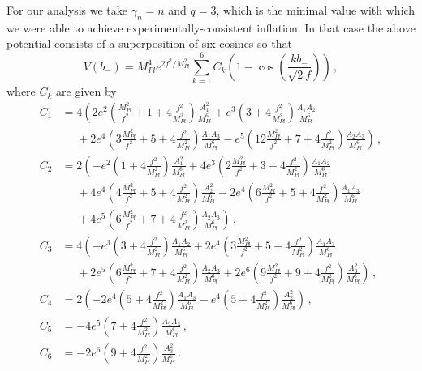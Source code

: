 \documentclass[12pt]{article}
\begin{document}
For our analysis we take $\gamma_n = n$ and $q = 3$, which is the minimal value with which we were able to achieve experimentally-consistent inflation.
In that case the above potential consists of a superposition of six cosines so that
\begin{equation} \label{eq:supergravity:Vslow3}
  V\left(b_-\right)
    = M_{Pl}^4 e^{2 f^2 / M_{Pl}^2} \sum_{k = 1}^6 C_k \left(1 - \cos\left(\frac{k b_-}{\sqrt{2} f}\right)\right)\,,
\end{equation}
where $C_k$ are given by
\begin{equation} \label{eq:supergravity:Vslow3Coefficients}
  \begin{aligned}
    C_1 &=   4 \left(
        2 e^2 \left(   \frac{M_{Pl}^2}{f^2} + 1 + 4 \frac{f^2}{M_{Pl}^2}\right) \frac{A_1^2  }{M_{Pl}^6}
      +   e^3 \left(                          3 + 4 \frac{f^2}{M_{Pl}^2}\right) \frac{A_1 A_2}{M_{Pl}^6}\right.\\
      &~~~~~~ \left.{}
      + 2 e^4 \left( 3 \frac{M_{Pl}^2}{f^2} + 5 + 4 \frac{f^2}{M_{Pl}^2}\right) \frac{A_1 A_3}{M_{Pl}^6}
      -   e^5 \left(12 \frac{M_{Pl}^2}{f^2} + 7 + 4 \frac{f^2}{M_{Pl}^2}\right) \frac{A_2 A_3}{M_{Pl}^6}
    \right)\,,\\
    C_2 &=   2 \left(
      -   e^2 \left(                          1 + 4 \frac{f^2}{M_{Pl}^2}\right) \frac{A_1^2  }{M_{Pl}^6}
      + 4 e^3 \left( 2 \frac{M_{Pl}^2}{f^2} + 3 + 4 \frac{f^2}{M_{Pl}^2}\right) \frac{A_1 A_2}{M_{Pl}^6}\right.\\
      &~~~~~~ \left.{}
      + 4 e^4 \left( 4 \frac{M_{Pl}^2}{f^2} + 5 + 4 \frac{f^2}{M_{Pl}^2}\right) \frac{A_2^2  }{M_{Pl}^6}
      - 2 e^4 \left( 6 \frac{M_{Pl}^2}{f^2} + 5 + 4 \frac{f^2}{M_{Pl}^2}\right) \frac{A_1 A_3}{M_{Pl}^6}\right.\\
      &~~~~~~ \left.{}
      + 4 e^5 \left( 6 \frac{M_{Pl}^2}{f^2} + 7 + 4 \frac{f^2}{M_{Pl}^2}\right) \frac{A_2 A_3}{M_{Pl}^6}
    \right)\,,\\
    C_3 &=   4 \left(
      -   e^3 \left(                          3 + 4 \frac{f^2}{M_{Pl}^2}\right) \frac{A_1 A_2}{M_{Pl}^6}
      + 2 e^4 \left( 3 \frac{M_{Pl}^2}{f^2} + 5 + 4 \frac{f^2}{M_{Pl}^2}\right) \frac{A_1 A_3}{M_{Pl}^6}\right.\\
      &~~~~~~ \left.{}
      + 2 e^5 \left( 6 \frac{M_{Pl}^2}{f^2} + 7 + 4 \frac{f^2}{M_{Pl}^2}\right) \frac{A_2 A_3}{M_{Pl}^6}
      + 2 e^6 \left( 9 \frac{M_{Pl}^2}{f^2} + 9 + 4 \frac{f^2}{M_{Pl}^2}\right) \frac{A_3^2  }{M_{Pl}^6}
    \right)\,,\\
    C_4 &=   2 \left(
      - 2 e^4 \left(                          5 + 4 \frac{f^2}{M_{Pl}^2}\right) \frac{A_1 A_3}{M_{Pl}^6}
      -   e^4 \left(                          5 + 4 \frac{f^2}{M_{Pl}^2}\right) \frac{A_2^2  }{M_{Pl}^6}
    \right)\,,\\
    C_5 &= - 4
          e^5 \left(                          7 + 4 \frac{f^2}{M_{Pl}^2}\right) \frac{A_2 A_3}{M_{Pl}^6}\,,\\
    C_6 &= - 2
          e^6 \left(                          9 + 4 \frac{f^2}{M_{Pl}^2}\right) \frac{A_3^2  }{M_{Pl}^6}\,.
  \end{aligned}
\end{equation}
\end{document}
